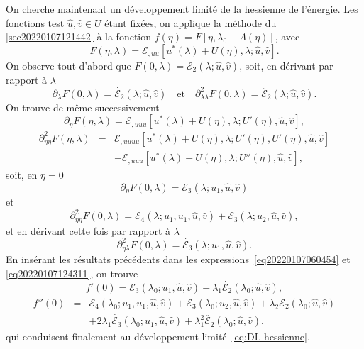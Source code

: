 \documentclass{article}
\newcommand{\nosymbol}{}
\begin{document}
On cherche maintenant un développement limité de la hessienne de
l'énergie. Les fonctions test $\hat{u}, \hat{v} \in U$ étant
fixées, on applique la méthode du
{\textsection}\ref{sec20220107121442} à la fonction $f (\eta) = F [\eta,
\lambda_0 + \Lambda (\eta)]$, avec
\[ F (\eta, \lambda) =\mathcal{E}_{, u  u} [u^{\ast} (\lambda) + U
   (\eta), \lambda ; \hat{u}, \hat{v}] . \]
On observe tout d'abord que $F (0, \lambda) =\mathcal{E}_2 (\lambda ; \hat{u},
\hat{v})$, soit, en dérivant par rapport à $\lambda$
\[ \partial_{\lambda} F (0, \lambda) = \dot{\mathcal{E}_2} (\lambda ; \hat{u},
   \hat{v}) \quad \text{et} \quad \partial_{\lambda  \lambda}^2 F (0,
   \lambda) = \ddot{\mathcal{E}_2} (\lambda ; \hat{u}, \hat{v}) . \]
On trouve de même successivement
\[ \partial_{\eta} F (\eta, \lambda) =\mathcal{E}_{, u  u  u}
   [u^{\ast} (\lambda) + U (\eta), \lambda ; U' (\eta), \hat{u}, \hat{v}], \]
\begin{eqnarray}
  \partial_{\eta  \eta}^2 F (\eta, \lambda) & = & \mathcal{E}_{, u
   u  u  u} [u^{\ast} (\lambda) + U (\eta), \lambda ;
  U' (\eta), U' (\eta), \hat{u}, \hat{v}] \nonumber\\
  &  & \nosymbol +\mathcal{E}_{, u  u  u} [u^{\ast} (\lambda)
  + U (\eta), \lambda ; U'' (\eta), \hat{u}, \hat{v}], \nonumber
\end{eqnarray}
soit, en $\eta = 0$
\[ \partial_{\eta} F (0, \lambda) =\mathcal{E}_3 (\lambda ; u_1, \hat{u},
   \hat{v}) \text{} \]
et
\[ \partial_{\eta  \eta}^2 F (0, \lambda) =\mathcal{E}_4 (\lambda ;
   u_1, u_1, \hat{u}, \hat{v}) +\mathcal{E}_3 (\lambda ; u_2, \hat{u},
   \hat{v}), \]
et en dérivant cette fois par rapport à $\lambda$
\[ \partial_{\eta  \lambda}^2 F (0, \lambda) = \dot{\mathcal{E}_3}
   (\lambda ; u_1, \hat{u}, \hat{v}) . \]
En insérant les résultats précédents dans les
expressions~\eqref{eq20220107060454} et \eqref{eq20220107124311}, on trouve
\[ f' (0) =\mathcal{E}_3 (\lambda_0 ; u_1, \hat{u}, \hat{v}) + \lambda_1
   \dot{\mathcal{E}_2} (\lambda_0 ; \hat{u}, \hat{v}), \]
\begin{eqnarray}
  f'' (0) & = & \mathcal{E}_4 (\lambda_0 ; u_1, u_1, \hat{u}, \hat{v})
  +\mathcal{E}_3 (\lambda_0 ; u_2, \hat{u}, \hat{v}) + \lambda_2
  \dot{\mathcal{E}_2} (\lambda_0 ; \hat{u}, \hat{v}) \nonumber\\
  &  & \nosymbol \nosymbol + 2 \lambda_1  \dot{\mathcal{E}_3} (\lambda_0 ;
  u_1, \hat{u}, \hat{v}) + \lambda_1^2  \ddot{\mathcal{E}_2} (\lambda_0 ;
  \hat{u}, \hat{v}) . \nonumber
\end{eqnarray}
qui conduisent finalement au développement limité~\eqref{eq:DL
hessienne}.
\end{document}
